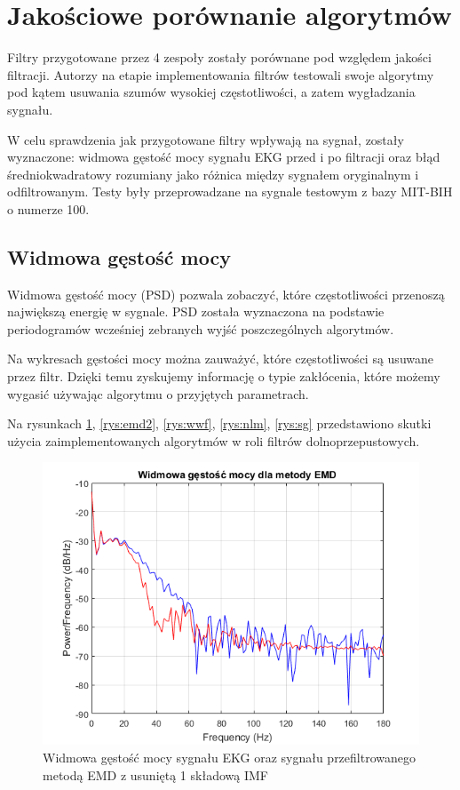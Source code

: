 \section{Jakościowe porównanie algorytmów}

Filtry przygotowane przez 4 zespoły zostały porównane pod względem jakości filtracji. Autorzy na etapie implementowania filtrów testowali swoje algorytmy pod kątem usuwania szumów wysokiej częstotliwości, a zatem wygładzania sygnału.

W celu sprawdzenia jak przygotowane filtry wpływają na sygnał, zostały wyznaczone: widmowa gęstość mocy sygnału EKG przed i po filtracji oraz błąd średniokwadratowy rozumiany jako różnica między sygnałem oryginalnym i odfiltrowanym. Testy były przeprowadzane na sygnale testowym z bazy MIT-BIH o numerze 100.

\subsection{Widmowa gęstość mocy}

Widmowa gęstość mocy (PSD) pozwala zobaczyć, które częstotliwości przenoszą największą energię w sygnale. PSD została wyznaczona na podstawie periodogramów wcześniej zebranych wyjść poszczególnych algorytmów.

Na wykresach gęstości mocy można zauważyć, które częstotliwości są usuwane przez filtr. Dzięki temu zyskujemy informację o typie zakłócenia, które możemy wygasić używając algorytmu o przyjętych parametrach.

Na rysunkach \ref{rys:emd}, \ref{rys:emd2}, \ref{rys:wwf}, \ref{rys:nlm}, \ref{rys:sg} przedstawiono skutki użycia zaimplementowanych algorytmów w roli filtrów dolnoprzepustowych. 

\begin{figure}[H]
  \begin{center}
    \includegraphics[scale=0.9]
    {img/emd_psd_250.png}
  \end{center}
  \caption{Widmowa gęstość mocy sygnału EKG oraz sygnału przefiltrowanego metodą EMD z usuniętą 1 składową IMF}
  \label{rys:emd}
\end{figure}

